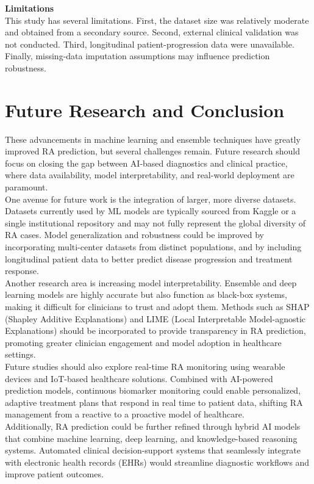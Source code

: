 \documentclass[10pt]{NSP1}
\begin{document}
	\textbf{Limitations}\\
	This study has several limitations. First, the dataset size was relatively moderate and obtained from a secondary source. Second, external clinical validation was not conducted. Third, longitudinal patient-progression data were unavailable. Finally, missing-data imputation assumptions may influence prediction robustness.
	
	\section{Future Research and Conclusion}
	These advancements in machine learning and ensemble techniques have greatly improved RA prediction, but several challenges remain. Future research should focus on closing the gap between AI-based diagnostics and clinical practice, where data availability, model interpretability, and real-world deployment are paramount.\\
	One avenue for future work is the integration of larger, more diverse datasets. Datasets currently used by ML models are typically sourced from Kaggle or a single institutional repository and may not fully represent the global diversity of RA cases. Model generalization and robustness could be improved by incorporating multi-center datasets from distinct populations, and by including longitudinal patient data to better predict disease progression and treatment response.\\
	Another research area is increasing model interpretability. Ensemble and deep learning models are highly accurate but also function as black-box systems, making it difficult for clinicians to trust and adopt them. Methods such as SHAP (Shapley Additive Explanations) and LIME (Local Interpretable Model-agnostic Explanations) should be incorporated to provide transparency in RA prediction, promoting greater clinician engagement and model adoption in healthcare settings.\\
	Future studies should also explore real-time RA monitoring using wearable devices and IoT-based healthcare solutions. Combined with AI-powered prediction models, continuous biomarker monitoring could enable personalized, adaptive treatment plans that respond in real time to patient data, shifting RA management from a reactive to a proactive model of healthcare.\\
	Additionally, RA prediction could be further refined through hybrid AI models that combine machine learning, deep learning, and knowledge-based reasoning systems. Automated clinical decision-support systems that seamlessly integrate with electronic health records (EHRs) would streamline diagnostic workflows and improve patient outcomes.
	
\end{document}
